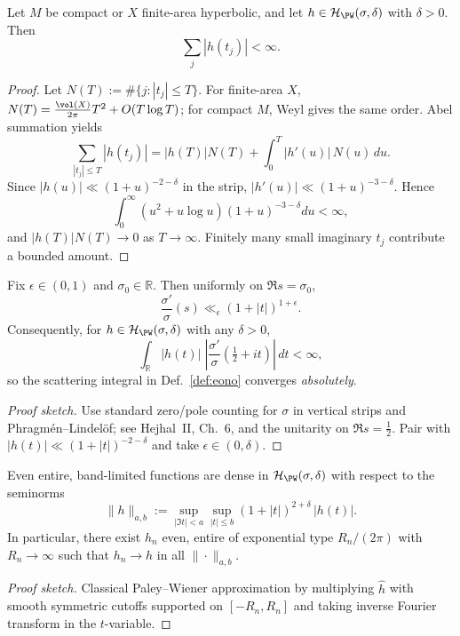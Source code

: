 \begin{lemma}
\label{lem:absolute-sum}
Let $M$ be compact or $X$ finite-area hyperbolic, and let $h\in\mathcal H_{\PW}(\sigma,\delta)$ with $\delta>0$. Then
\[
  \sum_j |h(t_j)|<\infty.
\]
\end{lemma}

\begin{proof}
Let $N(T):=\#\{j: |t_j|\le T\}$. For finite-area $X$, $N(T)=\frac{\vol(X)}{2\pi}T^2+O(T\log T)$; for compact $M$, Weyl gives the same order. Abel summation yields
\[
\sum_{|t_j|\le T} |h(t_j)|
 = |h(T)|N(T) + \int_0^T |h'(u)|\,N(u)\,du.
\]
Since $|h(u)|\ll (1+u)^{-2-\delta}$ in the strip, $|h'(u)|\ll (1+u)^{-3-\delta}$. Hence
\[
 \int_0^\infty (u^2+u\log u)(1+u)^{-3-\delta} du<\infty,
\]
and $|h(T)|N(T)\to0$ as $T\to\infty$. Finitely many small imaginary $t_j$ contribute a bounded amount.
\end{proof}

\begin{lemma}
\label{lem:growth-sigma-abs}
Fix $\epsilon\in(0,1)$ and $\sigma_0\in\mathbb R$. Then uniformly on $\Re s=\sigma_0$,
\[
  \frac{\sigma'}{\sigma}(s) \ll_\epsilon (1+|t|)^{1+\epsilon}.
\]
Consequently, for $h\in\mathcal H_{\PW}(\sigma,\delta)$ with any $\delta>0$,
\[
  \int_{\mathbb R} |h(t)|\;\left|\frac{\sigma'}{\sigma}\!\left(\tfrac12+it\right)\right|\,dt<\infty,
\]
so the scattering integral in Def.~\ref{def:eono} converges \emph{absolutely}.
\end{lemma}

\begin{proof}[Proof sketch]
Use standard zero/pole counting for $\sigma$ in vertical strips and Phragmén–Lindelöf; see Hejhal~II, Ch.~6, and the unitarity on $\Re s=\tfrac12$. Pair with $|h(t)|\ll(1+|t|)^{-2-\delta}$ and take $\epsilon\in(0,\delta)$.
\end{proof}

\begin{proposition}
\label{prop:density}
Even entire, band-limited functions are dense in $\mathcal H_{\PW}(\sigma,\delta)$ with respect to the seminorms
\[
  \|h\|_{a,b}:=\sup_{|\Im t|<a}\sup_{|t|\le b} (1+|t|)^{2+\delta}\,|h(t)|.
\]
In particular, there exist $h_n$ even, entire of exponential type $R_n/(2\pi)$ with $R_n\to\infty$ such that $h_n\to h$ in all $\|\cdot\|_{a,b}$.
\end{proposition}

\begin{proof}[Proof sketch]
Classical Paley–Wiener approximation by multiplying $\hat h$ with smooth symmetric cutoffs supported on $[-R_n,R_n]$ and taking inverse Fourier transform in the $t$-variable.
\end{proof}

